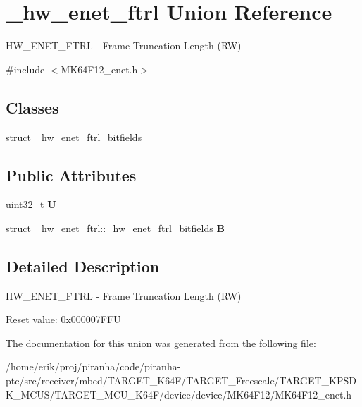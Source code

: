 \hypertarget{union__hw__enet__ftrl}{}\section{\+\_\+hw\+\_\+enet\+\_\+ftrl Union Reference}
\label{union__hw__enet__ftrl}


H\+W\+\_\+\+E\+N\+E\+T\+\_\+\+F\+T\+RL -\/ Frame Truncation Length (RW)  




{\ttfamily \#include $<$M\+K64\+F12\+\_\+enet.\+h$>$}

\subsection*{Classes}
\begin{DoxyCompactItemize}
\item 
struct \hyperlink{struct__hw__enet__ftrl_1_1__hw__enet__ftrl__bitfields}{\+\_\+hw\+\_\+enet\+\_\+ftrl\+\_\+bitfields}
\end{DoxyCompactItemize}
\subsection*{Public Attributes}
\begin{DoxyCompactItemize}
\item 
uint32\+\_\+t {\bfseries U}\hypertarget{union__hw__enet__ftrl_aea7eb75cdb9cfb744442844aed54ba94}{}\label{union__hw__enet__ftrl_aea7eb75cdb9cfb744442844aed54ba94}

\item 
struct \hyperlink{struct__hw__enet__ftrl_1_1__hw__enet__ftrl__bitfields}{\+\_\+hw\+\_\+enet\+\_\+ftrl\+::\+\_\+hw\+\_\+enet\+\_\+ftrl\+\_\+bitfields} {\bfseries B}\hypertarget{union__hw__enet__ftrl_af6da895b42dbf6d5ec3a88ad80731b59}{}\label{union__hw__enet__ftrl_af6da895b42dbf6d5ec3a88ad80731b59}

\end{DoxyCompactItemize}


\subsection{Detailed Description}
H\+W\+\_\+\+E\+N\+E\+T\+\_\+\+F\+T\+RL -\/ Frame Truncation Length (RW) 

Reset value\+: 0x000007\+F\+FU 

The documentation for this union was generated from the following file\+:\begin{DoxyCompactItemize}
\item 
/home/erik/proj/piranha/code/piranha-\/ptc/src/receiver/mbed/\+T\+A\+R\+G\+E\+T\+\_\+\+K64\+F/\+T\+A\+R\+G\+E\+T\+\_\+\+Freescale/\+T\+A\+R\+G\+E\+T\+\_\+\+K\+P\+S\+D\+K\+\_\+\+M\+C\+U\+S/\+T\+A\+R\+G\+E\+T\+\_\+\+M\+C\+U\+\_\+\+K64\+F/device/device/\+M\+K64\+F12/M\+K64\+F12\+\_\+enet.\+h\end{DoxyCompactItemize}
